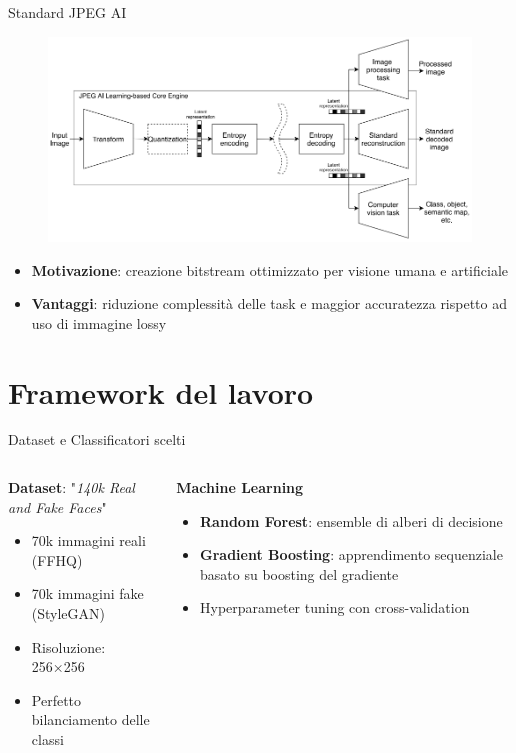 \documentclass[11pt]{beamer}
\begin{document}
\begin{frame}{Standard JPEG AI}
\begin{figure}
    \centering
    \includegraphics[width=0.68\linewidth]{assets/JPEGAI framework.png}
    \label{fig:jpegai_framework}
\end{figure}
\begin{itemize}
    \item \textbf{Motivazione}: creazione bitstream ottimizzato per visione umana e artificiale
    \item \textbf{Vantaggi}: riduzione complessità delle task e maggior accuratezza rispetto ad uso di immagine lossy
\end{itemize}
\end{frame}
\section{Framework del lavoro}
\begin{frame}{Dataset e Classificatori scelti}
    \begin{columns}[t]
        \begin{column}{0.5\textwidth}
            \textbf{Dataset}: "\textit{140k Real and Fake Faces}"
            \begin{itemize}
                \item 70k immagini reali (FFHQ)
                \item 70k immagini fake (StyleGAN)
                \item Risoluzione: 256×256
                \item Perfetto bilanciamento delle classi
            \end{itemize}
        \end{column}
        \begin{column}{0.5\textwidth}
            \textbf{Machine Learning}
            \begin{itemize}
                \item \textbf{Random Forest}: ensemble di alberi di decisione
                \item \textbf{Gradient Boosting}: apprendimento sequenziale basato su boosting del gradiente
                \item Hyperparameter tuning con cross-validation
            \end{itemize}
        \end{column}
    \end{columns}
\end{frame}
\end{document}
